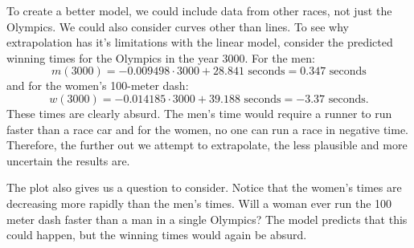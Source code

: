 To create a better model, we could include data from other races, not just the Olympics. We could also consider curves other than lines. To see why extrapolation has it's limitations with the linear model, consider the predicted winning times for the Olympics in the year 3000. For the men:
$$m(3000) = -0.009498\cdot 3000 + 28.841\mbox{ seconds} = 0.347 \mbox{ seconds}$$
and for the women's 100-meter dash:
$$w(3000) = -0.014185\cdot 3000 + 39.188\mbox{ seconds} = -3.37 \mbox{ seconds.}$$
These times are clearly absurd. The men's time would require a runner to run faster than a race car and for the women, no one can run a race in negative time. Therefore, the further out we attempt to extrapolate, the less plausible and more uncertain the results are.

The plot also gives us a question to consider. Notice that the women's times are decreasing more rapidly than the men's times. Will a woman ever run the 100 meter dash faster than a man in a single Olympics? The model predicts that this could happen, but the winning times would again be absurd.



